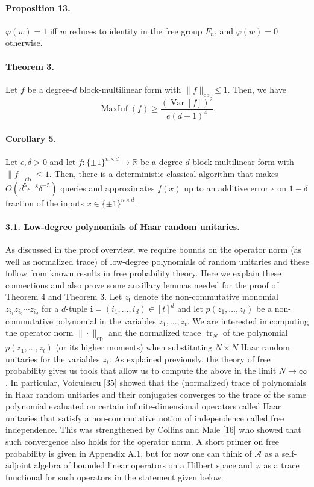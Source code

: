 \documentclass[10pt,a4paper]{article}
\begin{document}
\paragraph{Proposition 13.}
$\varphi(w)=1$ iff $w$ reduces to identity in the free group $F_n$, and $\varphi(w)=0$ otherwise.

\paragraph{Theorem 3.}
Let $f$ be a degree-$d$ block-multilinear form with $\|f\|_{\mathrm{cb}}\leq1$. Then, we have
\[\operatorname{MaxInf}(f)\geq\frac{(\operatorname{Var}[f])^2}{e(d+1)^4}.\]
\paragraph{Corollary 5.}
Let $\epsilon,\delta>0$ and let $f:\{\pm1\}^{n\times d}\to\mathbb R$ be a degree-$d$ block-multilinear form with $\|f\|_{\mathrm{cb}}\leq1$. Then, there is a deterministic classical algorithm that makes $O(d^5\epsilon^{-8}\delta^{-5})$ queries and approximates $f(x)$ up to an additive error $\epsilon$ on $1-\delta$ fraction of the inputs $x\in\{\pm1\}^{n\times d}$.

\paragraph{3.1. Low-degree polynomials of Haar random unitaries.}
As discussed in the proof overview, we require bounds on the operator norm (as well as normalized trace) of low-degree polynomials of random unitaries and these follow from known results in free probability theory. Here we explain these connections and also prove some auxillary lemmas needed for the proof of Theorem 4 and Theorem 3.
Let $z_{\mathbf i}$ denote the non-commutative monomial $z_{i_1}z_{i_2}\cdots z_{i_d}$ for a $d$-tuple $\mathbf i=(i_1,\ldots,i_d)\in[t]^d$ and let $p(z_1,\ldots,z_t)$ be a non-commutative polynomial in the variables $z_1,\ldots,z_t$. We are interested in computing the operator norm $\|\cdot\|_{\mathrm{op}}$ and the normalized trace $\operatorname{tr}_N$ of the polynomial $p(z_1,\ldots,z_t)$ (or its higher moments) when substituting $N\times N$ Haar random unitaries for the variables $z_i$.
As explained previously, the theory of free probability gives us tools that allow us to compute the above in the limit $N\to\infty$. In particular, Voiculescu [35] showed that the (normalized) trace of polynomials in Haar random unitaries and their conjugates converges to the trace of the same polynomial evaluated on certain infinite-dimensional operators called Haar unitaries that satisfy a non-commutative notion of independence called free independence. This was strengthened by Collins and Male [16] who showed that such convergence also holds for the operator norm. A short primer on free probability is given in Appendix A.1, but for now one can think of $\mathcal A$ as a self-adjoint algebra of bounded linear operators on a Hilbert space and $\varphi$ as a trace functional for such operators in the statement given below.
\end{document}
